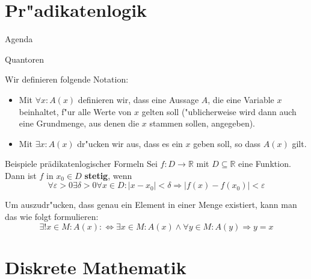 \documentclass{beamer}
\begin{document}
\section{Pr"adikatenlogik}
\begin{frame}{Agenda}
   
    
  \tableofcontents[currentsection]
  \end{frame}
\begin{frame}{Quantoren}
 
  \begin{definition}[Quantoren]
    Wir definieren folgende Notation:
    \begin{itemize}
      \item Mit $\forall x:A(x)$ definieren wir, dass eine Aussage $A$, die eine Variable $x$ beinhaltet, f"ur alle Werte von $x$ gelten soll ("ublicherweise wird dann auch eine Grundmenge, aus denen die $x$ stammen sollen, angegeben).
      \item Mit $\exists x:A(x)$ dr"ucken wir aus, dass es ein $x$ geben soll, so dass $A(x)$ gilt.
    \end{itemize}
  \end{definition}

 
\end{frame}

\begin{frame}{Beispiele pr\"adikatenlogischer Formeln}
  Sei $f:D\to \mathbb{R}$ mit $D\subseteq\mathbb{R}$ eine Funktion. Dann ist $f$ in $x_0\in D$ \textbf{stetig}, wenn \[\forall\varepsilon>0\exists\delta>0\forall x\in D:|x-x_0|<\delta\Rightarrow |f(x)-f(x_0)|<\varepsilon\]

  Um auszudr"ucken, dass genau ein Element in einer Menge existiert, kann man das wie folgt formulieren: \[\exists! x\in M: A(x):\Leftrightarrow \exists x\in M: A(x) \wedge \forall y\in M: A(y)\Rightarrow y=x\]

\end{frame}

\section{Diskrete Mathematik}
\end{document}
